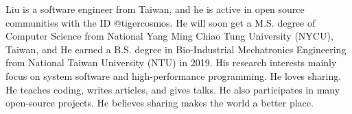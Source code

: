 

\begin{cvparagraph}

Liu is a software engineer from Taiwan, and he is active in open source communities with the ID @tigercosmos.
He will soon get a M.S. degree of Computer Science from National Yang Ming Chiao Tung University (NYCU), Taiwan, and
He earned a B.S. degree in Bio-Industrial Mechatronics Engineering from National Taiwan University (NTU) in 2019.
His research interests mainly focus on system software and high-performance programming.
He loves sharing. He teaches coding, writes articles, and gives talks. He also participates in many open-source projects.
He believes sharing makes the world a better place.
\end{cvparagraph}

